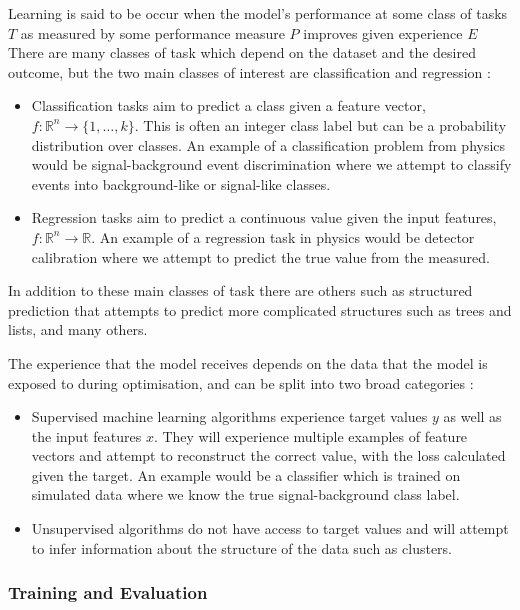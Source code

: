 Learning is said to be occur when the model's performance at some class of tasks $T$ as measured by some performance measure $P$ improves given experience $E$ \cite{Learning} 
There are many classes of task which depend on the dataset and the desired outcome, but the two main classes of interest are classification and regression \cite{DeepLearningBook}:
\begin{itemize}[leftmargin=.5in,noitemsep]
    \item Classification tasks aim to predict a class given a feature vector, $f:\mathds{R}^{n}\rightarrow{}\{1,\dots,k\}$.
This is often an integer class label but can be a probability distribution over classes. An example of a classification problem from physics would be signal-background event discrimination where we attempt to classify events into background-like or signal-like classes.
    \item Regression tasks aim to predict a continuous value given the input features, $f:\mathds{R}^{n}\rightarrow\mathds{R}$. An example of a regression task in physics would be detector calibration where we attempt to predict the true value from the measured. 
\end{itemize}
In addition to these main classes of task there are others such as structured prediction that attempts to predict more complicated structures such as trees and lists, and many others. 


The experience that the model receives depends on the data that the model is exposed to during optimisation, and can be split into two broad categories \cite{DeepLearningBook}:
\begin{itemize}[leftmargin=.5in,noitemsep]
    \item Supervised machine learning algorithms experience target values $y$ as well as the input features $x$. They will experience multiple examples of feature vectors and attempt to reconstruct the correct value, with the loss calculated given the target. An example would be a classifier which is trained on simulated data where we know the true signal-background class label. 
    \item Unsupervised algorithms do not have access to target values and will attempt to infer information about the structure of the data such as clusters.
\end{itemize}



\subsubsection{Training and Evaluation}

